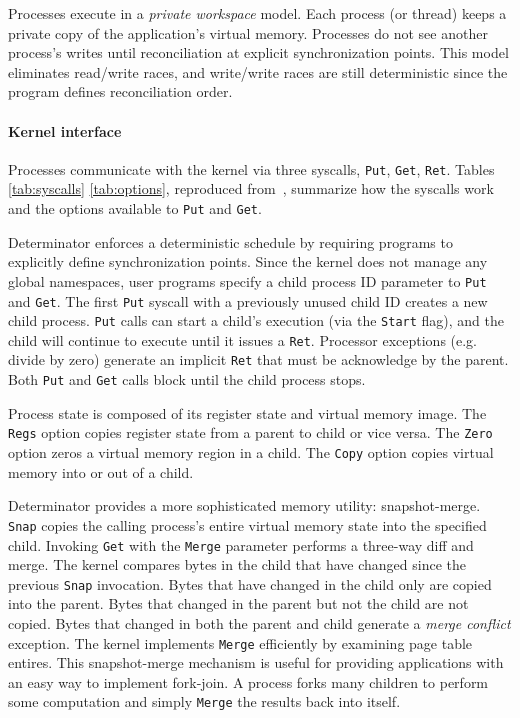 Processes execute in a \emph{private workspace} model. Each process (or thread)
keeps a private copy of the application's virtual memory. Processes do not
see another process's writes until reconciliation at explicit synchronization
points. This model eliminates read/write races, and write/write races are still
deterministic since the program defines reconciliation order.




\paragraph{Kernel interface} Processes communicate with the kernel via three
syscalls, {\tt Put}, {\tt Get}, {\tt Ret}. Tables \ref{tab:syscalls}
\ref{tab:options}, reproduced from~\cite{Aviram10}, summarize how the syscalls
work and the options available to {\tt Put} and {\tt Get}.

Determinator enforces a deterministic schedule by requiring programs to
explicitly define synchronization points. Since the kernel does not manage any
global namespaces, user programs specify
a child process ID parameter to {\tt Put} and {\tt Get}. The first {\tt Put}
syscall with a previously unused child ID creates a new child process.
{\tt Put} calls can start a child's execution (via the {\tt Start} flag), and
the child will continue to execute until it issues a {\tt Ret}. Processor
exceptions (e.g. divide by zero) generate an implicit {\tt Ret} that must be
acknowledge by the parent. Both {\tt Put} and {\tt Get} calls block until the
child process stops.

Process state is composed of its register state and virtual memory image.
The {\tt Regs} option copies register state from a parent to child or vice
versa. The {\tt Zero} option zeros a virtual memory region in a child. The
{\tt Copy} option copies virtual memory into or out of a child.

Determinator provides a more sophisticated memory utility: snapshot-merge.
{\tt Snap} copies the calling process's entire virtual memory state into the
specified child. Invoking {\tt Get} with the {\tt Merge} parameter performs a
three-way diff and merge. The kernel compares bytes
in the child that have changed since the previous {\tt Snap} invocation. Bytes
that have changed in the child only are copied into the parent. Bytes that
changed in the parent but not the child are not copied.
Bytes that changed in both the parent and child generate a
\emph{merge conflict} exception. The kernel implements {\tt Merge} efficiently
by examining page table entires. This snapshot-merge mechanism is useful for
providing applications with an easy way to implement fork-join. A process forks
many children to perform some computation and simply {\tt Merge} the results
back into itself.

